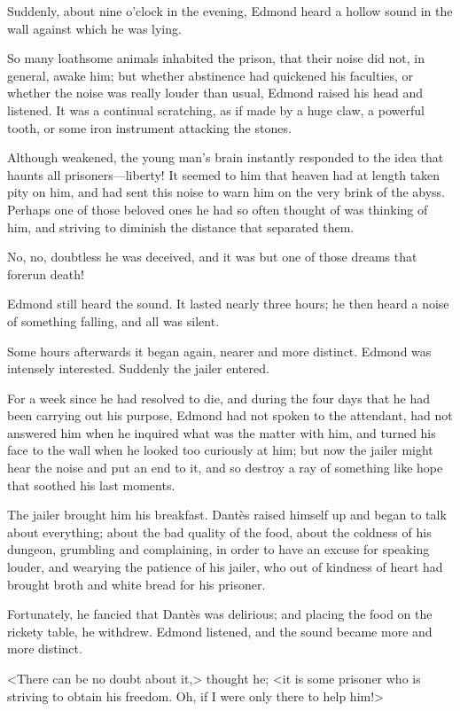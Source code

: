  Suddenly, about nine o'clock in the evening, Edmond heard a hollow sound in the wall against which he was lying. 

 So many loathsome animals inhabited the prison, that their noise did not, in general, awake him; but whether abstinence had quickened his faculties, or whether the noise was really louder than usual, Edmond raised his head and listened. It was a continual scratching, as if made by a huge claw, a powerful tooth, or some iron instrument attacking the stones. 

 Although weakened, the young man's brain instantly responded to the idea that haunts all prisoners—liberty! It seemed to him that heaven had at length taken pity on him, and had sent this noise to warn him on the very brink of the abyss. Perhaps one of those beloved ones he had so often thought of was thinking of him, and striving to diminish the distance that separated them. 

 No, no, doubtless he was deceived, and it was but one of those dreams that forerun death! 

 Edmond still heard the sound. It lasted nearly three hours; he then heard a noise of something falling, and all was silent. 

 Some hours afterwards it began again, nearer and more distinct. Edmond was intensely interested. Suddenly the jailer entered. 

 For a week since he had resolved to die, and during the four days that he had been carrying out his purpose, Edmond had not spoken to the attendant, had not answered him when he inquired what was the matter with him, and turned his face to the wall when he looked too curiously at him; but now the jailer might hear the noise and put an end to it, and so destroy a ray of something like hope that soothed his last moments. 

 The jailer brought him his breakfast. Dantès raised himself up and began to talk about everything; about the bad quality of the food, about the coldness of his dungeon, grumbling and complaining, in order to have an excuse for speaking louder, and wearying the patience of his jailer, who out of kindness of heart had brought broth and white bread for his prisoner. 

 Fortunately, he fancied that Dantès was delirious; and placing the food on the rickety table, he withdrew. Edmond listened, and the sound became more and more distinct. 

 <There can be no doubt about it,> thought he; <it is some prisoner who is striving to obtain his freedom. Oh, if I were only there to help him!> 

